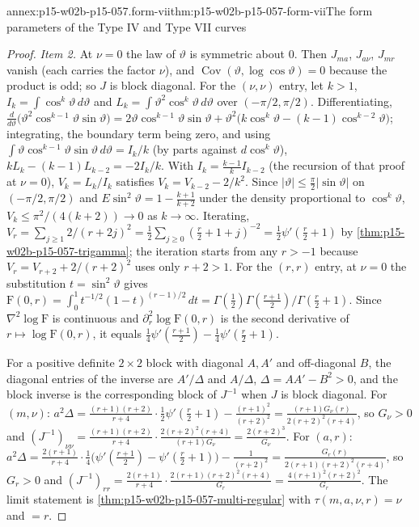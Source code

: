 \begin{annexitem}{annex:p15-w02b-p15-057.form-vii}{thm:p15-w02b-p15-057-form-vii}{The form parameters of the Type IV and Type VII curves}
\begin{proof}
\emph{Item 2.} At \(\nu=0\) the law of \(\vartheta\) is symmetric about
\(0\). Then \(J_{ma}\), \(J_{a\nu}\), \(J_{mr}\) vanish (each carries the
factor \(\nu\)), and \(\operatorname{Cov}(\vartheta,\log\cos\vartheta)=0\)
because the product is odd; so \(J\) is block diagonal. For the
\((\nu,\nu)\) entry, let \(k>1\), \(I_k=\int\cos^k\vartheta\,d\vartheta\)
and \(L_k=\int\vartheta^2\cos^k\vartheta\,d\vartheta\) over
\((-\pi/2,\pi/2)\). Differentiating,
\(\frac d{d\vartheta}\bigl(\vartheta^2\cos^{k-1}\vartheta\sin\vartheta\bigr)
=2\vartheta\cos^{k-1}\vartheta\sin\vartheta+\vartheta^2\bigl(k\cos^k
\vartheta-(k-1)\cos^{k-2}\vartheta\bigr)\); integrating, the boundary term
being zero, and using \(\int\vartheta\cos^{k-1}\vartheta\sin\vartheta\,
d\vartheta=I_k/k\) (by parts against \(d\cos^k\vartheta\)),
\(kL_k-(k-1)L_{k-2}=-2I_k/k\). With \(I_k=\frac{k-1}kI_{k-2}\) (the
recursion of that proof at \(\nu=0\)), \(V_k=L_k/I_k\) satisfies
\(V_k=V_{k-2}-2/k^2\). Since \(|\vartheta|\leq\frac\pi2|\sin\vartheta|\)
on \((-\pi/2,\pi/2)\) and \(E\sin^2\vartheta=1-\frac{k+1}{k+2}\) under the
density proportional to \(\cos^k\vartheta\), \(V_k\leq\pi^2/(4(k+2))\to0\)
as \(k\to\infty\). Iterating, \(V_r=\sum_{j\geq1}2/(r+2j)^2
=\frac12\sum_{j\geq0}(\frac r2+1+j)^{-2}=\frac12\psi'(\frac r2+1)\) by
\cref{thm:p15-w02b-p15-057-trigamma}; the iteration starts from any
\(r>-1\) because \(V_r=V_{r+2}+2/(r+2)^2\) uses only \(r+2>1\). For the
\((r,r)\) entry, at \(\nu=0\) the substitution \(t=\sin^2\vartheta\) gives
\(\mathrm F(0,r)=\int_0^1t^{-1/2}(1-t)^{(r-1)/2}\,dt
=\Gamma(\frac12)\Gamma(\frac{r+1}2)/\Gamma(\frac r2+1)\). Since
\(\nabla^2\log\mathrm F\) is continuous and \(\partial_r^2\log\mathrm F(0,r)\)
is the second derivative of \(r\mapsto\log\mathrm F(0,r)\), it equals
\(\frac14\psi'(\frac{r+1}2)-\frac14\psi'(\frac r2+1)\).

For a positive definite \(2\times2\) block with diagonal \(A,A'\) and
off-diagonal \(B\), the diagonal entries of the inverse are \(A'/\Delta\)
and \(A/\Delta\), \(\Delta=AA'-B^2>0\), and the block inverse is the
corresponding block of \(J^{-1}\) when \(J\) is block diagonal. For
\((m,\nu)\): \(a^2\Delta=\frac{(r+1)(r+2)}{r+4}\cdot\frac12\psi'(\frac r2+1)
-\frac{(r+1)^2}{(r+2)^2}=\frac{(r+1)G_\nu(r)}{2(r+2)^2(r+4)}\), so
\(G_\nu>0\) and \((J^{-1})_{\nu\nu}=\frac{(r+1)(r+2)}{r+4}\cdot
\frac{2(r+2)^2(r+4)}{(r+1)G_\nu}=\frac{2(r+2)^3}{G_\nu}\). For \((a,r)\):
\(a^2\Delta=\frac{2(r+1)}{r+4}\cdot\frac14\bigl(\psi'(\frac{r+1}2)
-\psi'(\frac r2+1)\bigr)-\frac1{(r+2)^2}=\frac{G_r(r)}{2(r+1)(r+2)^2(r+4)}\),
so \(G_r>0\) and \((J^{-1})_{rr}=\frac{2(r+1)}{r+4}\cdot
\frac{2(r+1)(r+2)^2(r+4)}{G_r}=\frac{4(r+1)^2(r+2)^2}{G_r}\). The limit
statement is \cref{thm:p15-w02b-p15-057-multi-regular} with
\(\tau(m,a,\nu,r)=\nu\) and \(=r\).


\end{proof}
\end{annexitem}
